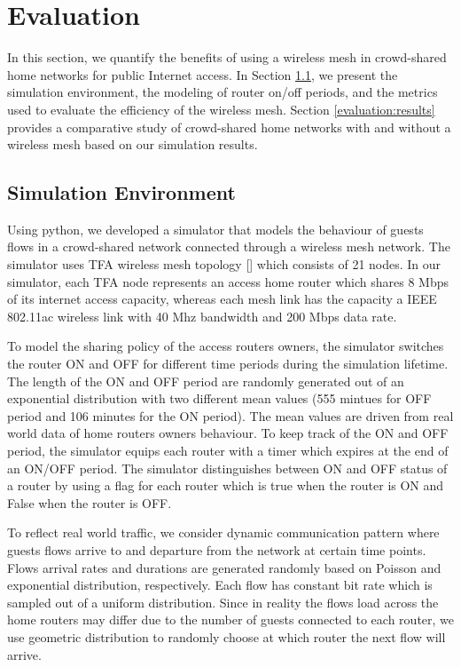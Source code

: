 \section{Evaluation}
\label{sec:evaluation}

In this section, we quantify the benefits of using a wireless mesh in crowd-shared home networks for public Internet access. In Section \ref{evaluation:environment}, we present the simulation environment, the modeling of router on/off periods, and the metrics used to evaluate the efficiency of the wireless mesh. Section \ref{evaluation:results} provides a comparative study of crowd-shared home networks with and without a wireless mesh based on our simulation results.

\subsection{Simulation Environment}
\label{evaluation:environment}

Using python, we developed a simulator that models the behaviour of guests flows in a crowd-shared network connected through a wireless mesh network. The simulator uses TFA wireless mesh topology [] which consists of 21 nodes. In our simulator, each TFA node represents an access home router which shares 8 Mbps of its internet access capacity, whereas each mesh link has the capacity a IEEE 802.11ac wireless link with 40 Mhz bandwidth and 200 Mbps data rate. 

To model the sharing policy of the access routers owners, the simulator switches the router ON and OFF for different time periods during the simulation lifetime. The length of the ON and OFF period are randomly generated out of an exponential distribution with two different mean values (555 mintues for OFF period and 106 minutes for the ON period). The mean values are driven from real world data of home routers owners behaviour. To keep track of the ON and OFF period, the simulator equips each router with a timer which expires at the end of an ON/OFF period. The simulator distinguishes between ON and OFF status of a router by using a flag for each router which is true when the router is ON and False when the router is OFF. 

To reflect real world traffic, we consider dynamic communication pattern where guests flows arrive to and departure from the network at certain time points. Flows arrival rates and durations are generated randomly based on Poisson and exponential distribution, respectively. Each flow has constant bit rate which is sampled out of a uniform distribution. Since in reality the flows load across the home routers may differ due to the number of guests connected to each router, we use geometric distribution to randomly choose at which router the next flow will arrive. 

